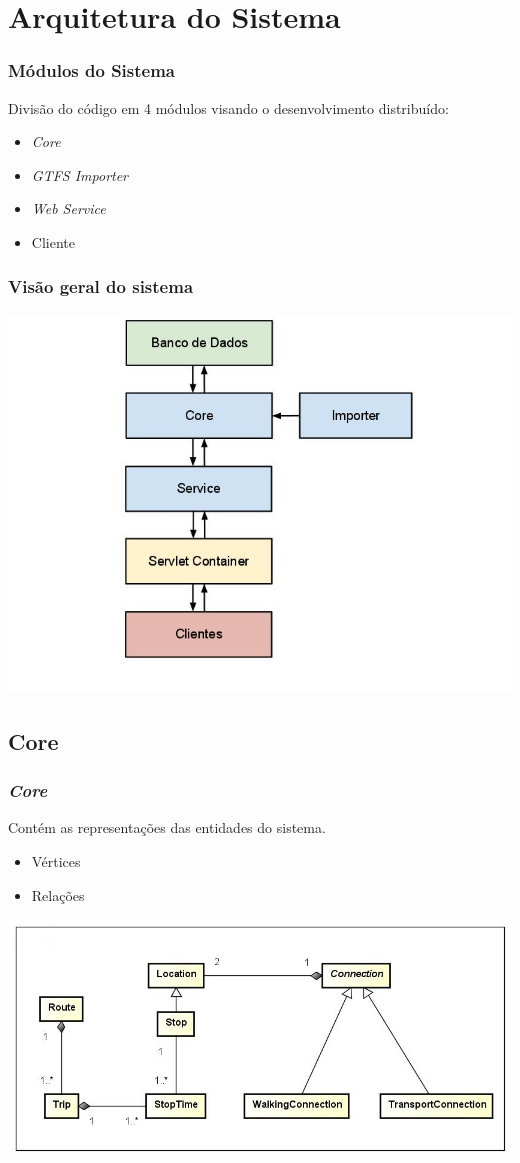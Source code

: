 \section{Arquitetura do Sistema}
\frame
{
\frametitle{Módulos do Sistema}
Divisão do código em 4 módulos visando o desenvolvimento distribuído:
\begin{itemize}
\item \emph{Core}
\item \emph{GTFS Importer}
\item \emph{Web Service}
\item Cliente
\end{itemize}
}

\frame
{
\frametitle{Visão geral do sistema}
\includegraphics[width=1\textwidth]{./imgs/arquitetura.png}
}

\subsection{Core}
\frame
{
\frametitle{\emph{Core}}
Contém as representações das entidades do sistema.
\begin{itemize}
\item Vértices
\item Relações
\end{itemize}
\includegraphics[width=1\textwidth]{./imgs/CoreDiagram.png}
}

